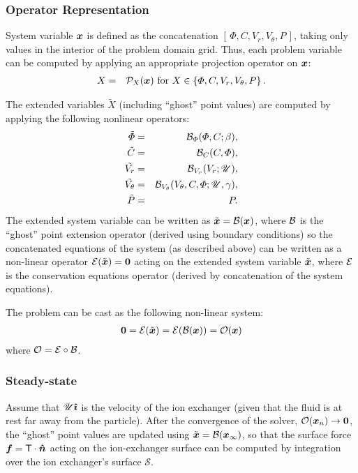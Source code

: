 \subsubsection{Operator Representation}
System variable $\boldsymbol{x}$ is defined as the concatenation $[\,\varPhi, C, V_r, V_\theta, P\,]$,
taking only values in the interior of the problem domain grid.
Thus, each problem variable can be computed by applying an appropriate projection operator on $\boldsymbol{x}$:
\begin{eqnarray}
X &=& \mathcal{P}_X(\boldsymbol{x}) \mbox{ for } X \in \left\{\varPhi, C, V_r, V_\theta, P\right\}.
\end{eqnarray}

The extended variables $\tilde X$ (including ``ghost'' point values) 
are computed by applying the following nonlinear operators:
\begin{eqnarray}
\tilde{\varPhi} &=& \mathcal{B}_\varPhi(\varPhi, C; \beta), \\
\tilde{C} &=& \mathcal{B}_C(C, \varPhi), \\
\tilde{V_r} &=& \mathcal{B}_{V_r}(V_r; \mathscr{U}), \\
\tilde{V_\theta} &=& \mathcal{B}_{V_\theta}(V_\theta, C, \varPhi; \mathscr{U}, \gamma), \\
\tilde{P} &=& P.
\end{eqnarray}
The extended system variable can be written as $\tilde{\boldsymbol{x}} = \mathcal{B}(\boldsymbol{x})$, 
where $\mathcal{B}$ is the ``ghost'' point extension operator (derived using boundary conditions)
so the concatenated equations of the system (as described above) can be written 
as a non-linear operator $\mathcal{E}(\tilde{\boldsymbol{x}}) = \boldsymbol{0}$ acting on the extended system variable 
$\tilde{\boldsymbol{x}}$, where $\mathcal{E}$ is the conservation equations operator 
(derived by concatenation of the system equations).

The problem can be cast as the following non-linear system:
\begin{eqnarray}
\boldsymbol{0} = \mathcal{E} (\tilde{\boldsymbol{x}}) = \mathcal{E} (\mathcal{B} (\boldsymbol{x})) = \mathcal{O}(\boldsymbol{x})
\end{eqnarray}
 where $\mathcal{O} = \mathcal{E} \circ \mathcal{B}$.

\subsubsection{Steady-state}
Assume that $\mathscr{U} \boldsymbol{\hat{\imath}}$ is the velocity of the ion exchanger 
(given that the fluid is at rest far away from the particle).
After the convergence of the solver, $\mathcal{O}(\boldsymbol{x}_n) \rightarrow \boldsymbol{0}$, 
the ``ghost'' point values are updated using $\tilde{\boldsymbol{x}} = \mathcal{B}(\boldsymbol{x}_\infty)$,
so  that the surface force $\boldsymbol{f} = \mathsf{T} \cdot \boldsymbol{\hat{n}}$ acting 
on the ion-exchanger surface
can be computed by integration over the ion exchanger's surface $\mathcal S$.


